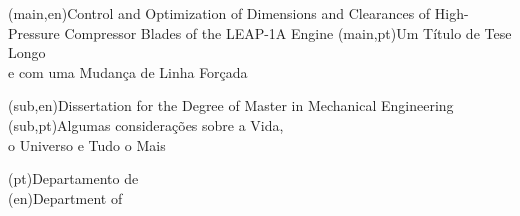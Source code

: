 
%


\nttitle(main,en){Control and Optimization of Dimensions and Clearances of High-Pressure Compressor Blades of the LEAP-1A Engine}%
\nttitle(main,pt){Um Título de Tese Longo\\e com uma Mudança de Linha Forçada}%

\nttitle(sub,en){Dissertation for the Degree of Master in Mechanical Engineering}%
\nttitle(sub,pt){Algumas considerações sobre a Vida,\\o Universo e Tudo o Mais}%

\ntdepartment*(pt){Departamento de\\}
\ntdepartment*(en){Department of\\}

